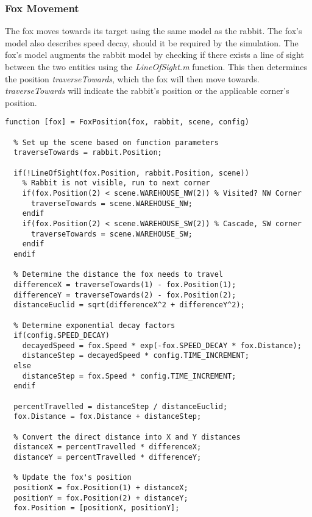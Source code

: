 \documentclass[11pt]{article}
\begin{document}
\subsubsection{Fox Movement}

The fox moves towards its target using the same model as the rabbit. The fox's model also describes speed decay, should it be required by the simulation. The fox's model augments the rabbit model by checking if there exists a line of sight between the two entities using the \textit{LineOfSight.m} function. This then determines the position \textit{traverseTowards}, which the fox will then move towards. \textit{traverseTowards} will indicate the rabbit's position or the applicable corner's position.

\bigskip

\begin{lstlisting}
function [fox] = FoxPosition(fox, rabbit, scene, config)
                                           
  % Set up the scene based on function parameters
  traverseTowards = rabbit.Position;
  
  if(!LineOfSight(fox.Position, rabbit.Position, scene))
    % Rabbit is not visible, run to next corner
    if(fox.Position(2) < scene.WAREHOUSE_NW(2)) % Visited? NW Corner
      traverseTowards = scene.WAREHOUSE_NW;
    endif
    if(fox.Position(2) < scene.WAREHOUSE_SW(2)) % Cascade, SW corner
      traverseTowards = scene.WAREHOUSE_SW;
    endif  
  endif
 
  % Determine the distance the fox needs to travel 
  differenceX = traverseTowards(1) - fox.Position(1);
  differenceY = traverseTowards(2) - fox.Position(2);
  distanceEuclid = sqrt(differenceX^2 + differenceY^2);
  
  % Determine exponential decay factors
  if(config.SPEED_DECAY)
    decayedSpeed = fox.Speed * exp(-fox.SPEED_DECAY * fox.Distance);
    distanceStep = decayedSpeed * config.TIME_INCREMENT;
  else
    distanceStep = fox.Speed * config.TIME_INCREMENT;
  endif
  
  percentTravelled = distanceStep / distanceEuclid; 
  fox.Distance = fox.Distance + distanceStep;
  
  % Convert the direct distance into X and Y distances
  distanceX = percentTravelled * differenceX;
  distanceY = percentTravelled * differenceY;
  
  % Update the fox's position
  positionX = fox.Position(1) + distanceX;
  positionY = fox.Position(2) + distanceY;
  fox.Position = [positionX, positionY];
\end{lstlisting}
\end{document}
